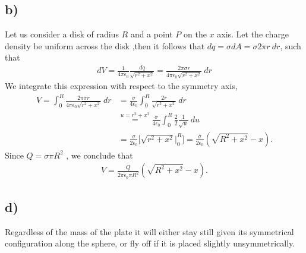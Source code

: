 \documentclass[
	12pt,
	]{article}
\newcommand{\ep}{\epsilon}
\theoremstyle{definition}
\theoremstyle{definition}
\theoremstyle{definition}
\theoremstyle{definition}
\theoremstyle{definition}
\theoremstyle{example}
\theoremstyle{note}
\theoremstyle{remark}
\theoremstyle{example}
\begin{document}
		 		\subsection*{b) }
		 			Let us consider a disk of radius $R$ and a point $P$ on the $x$ axis. Let the charge density be uniform across the disk ,then it follows that $dq = \sigma dA = \sigma 2\pi r \ dr$, such that
		 			\begin{align*}
		 				 dV = \frac{1}{4 \pi \ep_{0}} \frac{dq}{\sqrt{r^{2} + x^{2}}} = \frac{2\pi \sigma r }{4 \pi \ep_{0} \sqrt{r^{2} + x^{2}}} \ dr
		 			\end{align*}
		 			We integrate this expression with respect to the symmetry axis, 
		 			\begin{align*}
		 				V = \int_{0}^{R} \frac{2\pi \sigma r }{4 \pi \ep_{0} \sqrt{r^{2} + x^{2}}} \ dr &= \frac{\sigma}{4 \ep_{0}} \int_{0}^{R} \frac{2r}{\sqrt{r^{2} + x^{2}}}  \ dr \\
		 				&\overset{u = r^{2} + x^{2}}{=} \frac{\sigma}{4 \ep_{0}} \int_{0}^{R} \frac{2}{2} \frac{1}{\sqrt{u}} \ du\\
		 				&= \frac{\sigma}{2 \ep_{0}} \Bigg[\sqrt{r^{2} + x^{2}}\Bigg|_{0}^{R}\Bigg] = \frac{\sigma}{2 \ep_{0}} (\sqrt{R^{2} + x^{2}} - x).
		 			\end{align*}
		 			Since $Q = \sigma \pi R^{2}$ , we conclude that
		 			\begin{align*}
		 				V = \frac{Q}{2 \pi \ep_{0} \pi R^{2}} (\sqrt{R^{2} + x^{2}} - x).
		 			\end{align*}
		 		\subsection*{d) }
		 			Regardless of the mass of the plate it will either stay still given its symmetrical configuration along the sphere, or fly off if it is placed slightly unsymmetrically.
	
\end{document}
